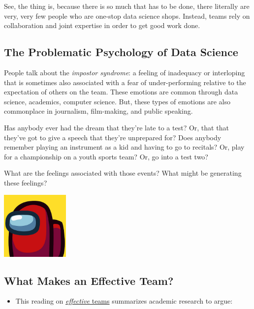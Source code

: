 \documentclass[
]{book}
\providecommand{\tightlist}{%
  \setlength{\itemsep}{0pt}\setlength{\parskip}{0pt}}
\theoremstyle{definition}
\theoremstyle{definition}
\theoremstyle{definition}
\theoremstyle{definition}
\theoremstyle{remark}
\begin{document}
See, the thing is, because there is so much that has to be done, there literally are very, very few people who are one-stop data science shops. Instead, teams rely on collaboration and joint expertise in order to get good work done.

\hypertarget{the-problematic-psychology-of-data-science}{%
\subsection{The Problematic Psychology of Data Science}\label{the-problematic-psychology-of-data-science}}

People talk about the \emph{impostor syndrome}: a feeling of inadequacy or interloping that is sometimes also associated with a fear of under-performing relative to the expectation of others on the team. These emotions are common through data science, academics, computer science. But, these types of emotions are also commonplace in journalism, film-making, and public speaking.

Has anybody ever had the dream that they're late to a test? Or, that that they've got to give a speech that they're unprepared for? Does anybody remember playing an instrument as a kid and having to go to recitals? Or, play for a championship on a youth sports team? Or, go into a test two?

What are the feelings associated with those events? What might be generating these feelings?

\includegraphics[width=0.25\textwidth,height=\textheight]{images/among_us.jpeg}

\hypertarget{what-makes-an-effective-team}{%
\subsection{What Makes an Effective Team?}\label{what-makes-an-effective-team}}

\begin{itemize}
\tightlist
\item
  This reading on \href{https://rework.withgoogle.com/print/guides/5721312655835136/}{\emph{effective} teams} summarizes academic research to argue:
\end{itemize}
\end{document}

